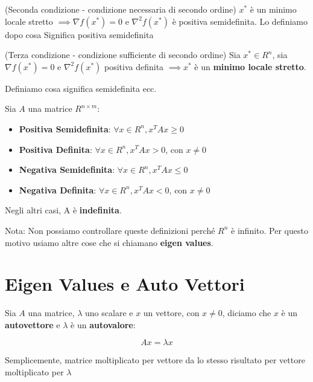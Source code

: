 \begin{definition}
    (Seconda condizione - condizione necessaria di secondo ordine)
    $x^*$ è un minimo locale stretto $\implies \nabla f(x^*) = 0$ e 
    $\nabla^2 f(x^*)$ è  positiva semidefinita. Lo definiamo dopo cosa Significa
    positiva semidefinita
\end{definition}

\begin{definition}
    (Terza condizione - condizione sufficiente di secondo ordine)
    Sia $x^* \in R^n$, sia $\nabla f(x^*) = 0$ e $\nabla^2 f(x^*)$ 
    positiva definita $\implies x^*$ è un \textbf{minimo locale stretto}.
\end{definition}

Definiamo cosa significa semidefinita ecc.

Sia $A$ una matrice $R^{n \times m}$:
\begin{itemize}
    \item \textbf{Positiva Semidefinita}: $\forall x \in R^n, x^TAx \geq 0$
    \item \textbf{Positiva Definita}: $\forall x \in R^n, x^TAx > 0$, con $x \neq 0$
    \item \textbf{Negativa Semidefinita}: $\forall x \in R^n, x^TAx \leq 0$
    \item \textbf{Negativa Definita}: $\forall x \in R^n, x^TAx < 0$, con $x \neq 0$
\end{itemize}

Negli altri casi, A è \textbf{indefinita}.

Nota: Non possiamo controllare queste definizioni perché $R^n$ è infinito. Per questo motivo usiamo
altre cose che si chiamano  \textbf{eigen values}.

\section{Eigen Values e Auto Vettori}

Sia $A$ una matrice, $\lambda$ uno scalare e $x$ un vettore, con $x \neq 0$, diciamo che 
$x$ è un \textbf{autovettore} e $\lambda$ è un \textbf{autovalore}:

$$
    Ax = \lambda x
$$

Semplicemente, matrice moltiplicato per vettore da lo stesso risultato per vettore
moltiplicato per $\lambda$

